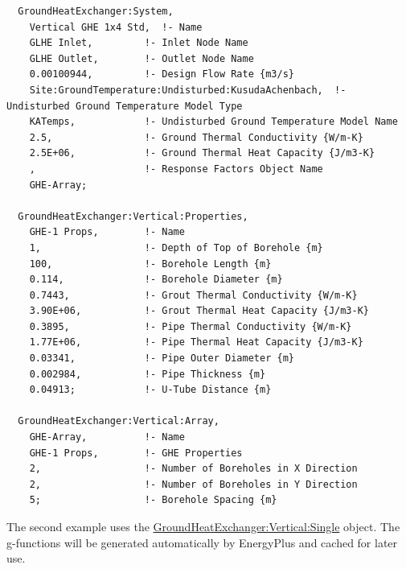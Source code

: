 \begin{lstlisting}
  GroundHeatExchanger:System,
    Vertical GHE 1x4 Std,  !- Name
    GLHE Inlet,         !- Inlet Node Name
    GLHE Outlet,        !- Outlet Node Name
    0.00100944,         !- Design Flow Rate {m3/s}
    Site:GroundTemperature:Undisturbed:KusudaAchenbach,  !- Undisturbed Ground Temperature Model Type
    KATemps,            !- Undisturbed Ground Temperature Model Name
    2.5,                !- Ground Thermal Conductivity {W/m-K}
    2.5E+06,            !- Ground Thermal Heat Capacity {J/m3-K}
    ,                   !- Response Factors Object Name
    GHE-Array;

  GroundHeatExchanger:Vertical:Properties,
    GHE-1 Props,        !- Name
    1,                  !- Depth of Top of Borehole {m}
    100,                !- Borehole Length {m}
    0.114,              !- Borehole Diameter {m}
    0.7443,             !- Grout Thermal Conductivity {W/m-K}
    3.90E+06,           !- Grout Thermal Heat Capacity {J/m3-K}
    0.3895,             !- Pipe Thermal Conductivity {W/m-K}
    1.77E+06,           !- Pipe Thermal Heat Capacity {J/m3-K}
    0.03341,            !- Pipe Outer Diameter {m}
    0.002984,           !- Pipe Thickness {m}
    0.04913;            !- U-Tube Distance {m}

  GroundHeatExchanger:Vertical:Array,
    GHE-Array,          !- Name
    GHE-1 Props,        !- GHE Properties
    2,                  !- Number of Boreholes in X Direction
    2,                  !- Number of Boreholes in Y Direction
    5;                  !- Borehole Spacing {m}
\end{lstlisting}

The second example uses the \hyperref[groundheatexchangerverticalsingle]{GroundHeatExchanger:Vertical:Single} object. The g-functions will be generated automatically by EnergyPlus and cached for later use.

